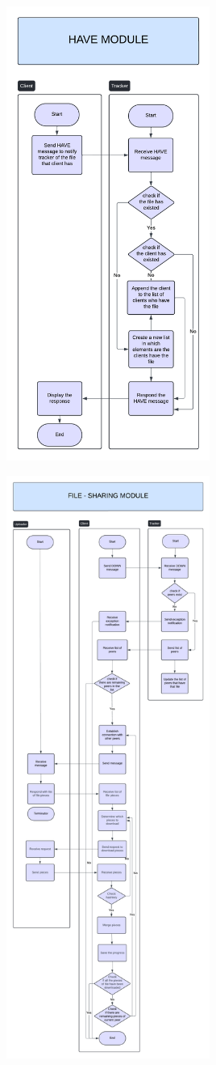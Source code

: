 \documentclass[a4paper]{article}
\begin{document}
\includegraphics[width=0.5\textwidth]{have_module.png} 

\includegraphics[width=0.5\textwidth]{file_sharing_module.png}
\end{document}
